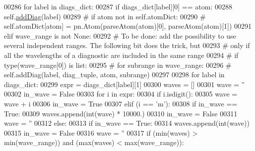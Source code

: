 \begin{DoxyCode}
00286             \textcolor{keywordflow}{for} label \textcolor{keywordflow}{in} diags\_dict:
00287                 \textcolor{keywordflow}{if} diags\_dict[label][0] == atom:
00288                     self.\hyperlink{classpyneb_1_1core_1_1diags_1_1_diagnostics_a508fa9c5a2216f9eb4128338c33a6f75}{addDiag}(label)
00289 \textcolor{comment}{#                    if atom not in self.atomDict:}
00290 \textcolor{comment}{#                        self.atomDict[atom] = pn.Atom(parseAtom(atom)[0], parseAtom(atom)[1])}
00291         \textcolor{keywordflow}{elif} wave\_range \textcolor{keywordflow}{is} \textcolor{keywordflow}{not} \textcolor{keywordtype}{None}:
00292 \textcolor{comment}{# To be done: add the possibility to use several independent ranges. The following bit does the trick, but}
00293 \textcolor{comment}{# only if all the wavelengths of a diagnostic are included in the same range}
00294 \textcolor{comment}{#            if type(wave\_range[0]) is list:}
00295 \textcolor{comment}{#                for subrange in wave\_range:}
00296 \textcolor{comment}{#                    self.addDiag(label, diag\_tuple, atom, subrange)}
00297                  
00298             \textcolor{keywordflow}{for} label \textcolor{keywordflow}{in} diags\_dict:
00299                 expr = diags\_dict[label][1]
00300                 waves = []
00301                 wave = \textcolor{stringliteral}{''}
00302                 in\_wave = \textcolor{keyword}{False}
00303                 \textcolor{keywordflow}{for} i \textcolor{keywordflow}{in} expr:
00304                     \textcolor{keywordflow}{if} i.isdigit():
00305                         wave = wave + i
00306                         in\_wave = \textcolor{keyword}{True}
00307                     \textcolor{keywordflow}{elif} (i == \textcolor{stringliteral}{'m'}):
00308                         \textcolor{keywordflow}{if} in\_wave == \textcolor{keyword}{True}:
00309                             waves.append(int(wave) * 10000.)
00310                             in\_wave = \textcolor{keyword}{False}
00311                             wave = \textcolor{stringliteral}{''}
00312                     \textcolor{keywordflow}{else}:
00313                         \textcolor{keywordflow}{if} in\_wave == \textcolor{keyword}{True}:
00314                             waves.append(int(wave))
00315                             in\_wave = \textcolor{keyword}{False}
00316                             wave = \textcolor{stringliteral}{''}
00317                 \textcolor{keywordflow}{if} (min(waves) > min(wave\_range)) \textcolor{keywordflow}{and} (max(waves) < max(wave\_range)):

\end{DoxyCode}
